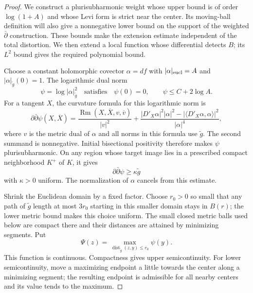\documentclass[11pt]{article}
\theoremstyle{definition}
\theoremstyle{remark}
\newcommand{\dd}{\partial\bar\partial}
\newcommand{\dbar}{\bar\partial}
\DeclareMathOperator{\Rm}{Rm}
\DeclareMathOperator{\dist}{dist}
\numberwithin{equation}{section}
\begin{document}
\begin{proof}
We construct a plurisubharmonic weight whose upper bound is of order
$\log(1+A)$ and whose Levi form is strict near the center.
Its moving-ball definition will also give a nonnegative lower bound
on the support of the weighted $\dbar$ construction.  These bounds
make the extension estimate independent of the total distortion.
We then extend a local function whose differential detects $B$;
its $L^2$ bound gives the required polynomial bound.

Choose a constant holomorphic covector $\alpha=df$ with
$|\alpha|_{\rm eucl}=A$ and $|\alpha|_{\widetilde g}(0)=1$.
The logarithmic dual norm
\[
 \psi=\log|\alpha|_{\widetilde g}^2
 \quad\text{satisfies}\quad
 \psi(0)=0,\qquad \psi\le C+2\log A.
\]
For a tangent $X$, the curvature formula for this logarithmic norm is
\[
 \dd\psi(X,\overline X)
 =\frac{\Rm(X,\overline X,v,\overline v)}{|v|^2}
  +\frac{|D'_X\alpha|^2|\alpha|^2
       -|\langle D'_X\alpha,\alpha\rangle|^2}{|\alpha|^4},
\]
where $v$ is the metric dual of $\alpha$ and all norms in this
formula use $\widetilde g$.  The second summand is nonnegative.
Initial bisectional positivity therefore makes $\psi$
plurisubharmonic.  On any region whose target image
lies in a prescribed compact neighborhood $K^+$ of $K$, it gives
\begin{equation}\label{chart:strict-covector}
 \dd\psi\ge\kappa\widetilde g
\end{equation}
with $\kappa>0$ uniform.  The normalization of $\alpha$ cancels
from this estimate.

Shrink the Euclidean domain by a fixed factor.  Choose $r_0>0$
so small that any path of $\widetilde g$ length at most $3r_0$
starting in this smaller domain stays in $B(r)$; the lower
metric bound makes this choice uniform.  The small closed metric
balls used below are compact there and their distances are
attained by minimizing segments.  Put
\begin{equation}\label{chart:metric-ball-envelope}
 \Psi(z)=\max_{\dist_{\widetilde g}(z,y)\le r_0}\psi(y).
\end{equation}
This function is continuous.  Compactness gives upper
semicontinuity.  For lower semicontinuity, move a maximizing
endpoint a little towards the center along a minimizing segment;
the resulting endpoint is admissible for all nearby centers and
its value tends to the maximum.


\end{proof}
\end{document}
